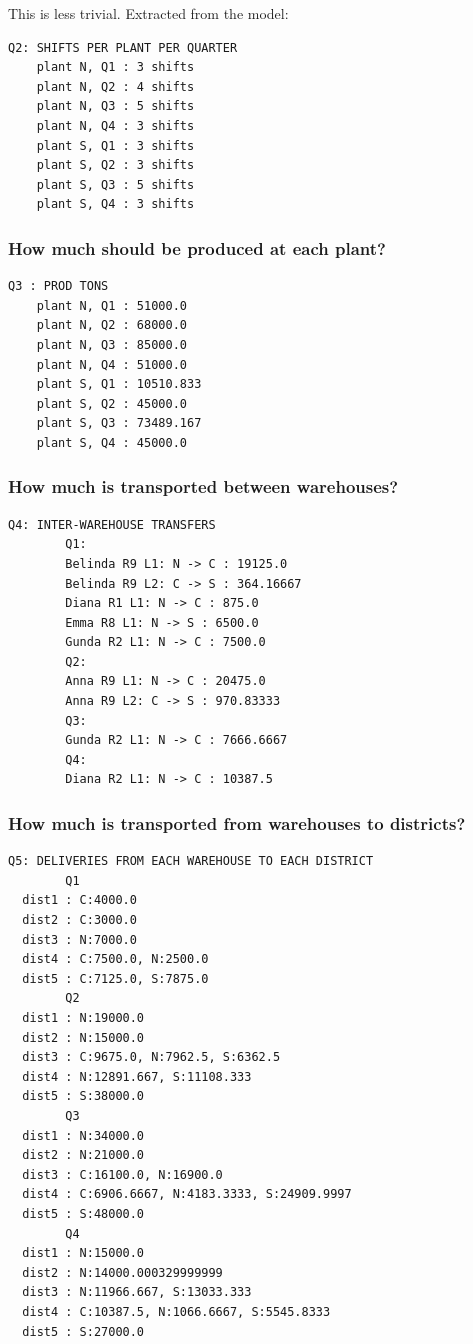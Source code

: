 \documentclass[10pt]{article}
\begin{document}
This is less trivial. Extracted from the model: 

\begin{verbatim}
Q2: SHIFTS PER PLANT PER QUARTER
    plant N, Q1 : 3 shifts
    plant N, Q2 : 4 shifts
    plant N, Q3 : 5 shifts
    plant N, Q4 : 3 shifts
    plant S, Q1 : 3 shifts
    plant S, Q2 : 3 shifts
    plant S, Q3 : 5 shifts
    plant S, Q4 : 3 shifts
\end{verbatim}
\subsubsection{How much should be produced at each plant?}
\begin{verbatim}
Q3 : PROD TONS
    plant N, Q1 : 51000.0
    plant N, Q2 : 68000.0
    plant N, Q3 : 85000.0
    plant N, Q4 : 51000.0
    plant S, Q1 : 10510.833
    plant S, Q2 : 45000.0
    plant S, Q3 : 73489.167
    plant S, Q4 : 45000.0
\end{verbatim}
\subsubsection{How much is transported between warehouses?}
\begin{verbatim}
Q4: INTER-WAREHOUSE TRANSFERS
        Q1:
        Belinda R9 L1: N -> C : 19125.0
        Belinda R9 L2: C -> S : 364.16667
        Diana R1 L1: N -> C : 875.0
        Emma R8 L1: N -> S : 6500.0
        Gunda R2 L1: N -> C : 7500.0
        Q2:
        Anna R9 L1: N -> C : 20475.0
        Anna R9 L2: C -> S : 970.83333
        Q3:
        Gunda R2 L1: N -> C : 7666.6667
        Q4:
        Diana R2 L1: N -> C : 10387.5
\end{verbatim}
\newpage 
\subsubsection{How much is transported from warehouses to districts?}
\begin{verbatim}
Q5: DELIVERIES FROM EACH WAREHOUSE TO EACH DISTRICT 
        Q1
  dist1 : C:4000.0
  dist2 : C:3000.0
  dist3 : N:7000.0
  dist4 : C:7500.0, N:2500.0
  dist5 : C:7125.0, S:7875.0
        Q2
  dist1 : N:19000.0
  dist2 : N:15000.0
  dist3 : C:9675.0, N:7962.5, S:6362.5
  dist4 : N:12891.667, S:11108.333
  dist5 : S:38000.0
        Q3
  dist1 : N:34000.0
  dist2 : N:21000.0
  dist3 : C:16100.0, N:16900.0
  dist4 : C:6906.6667, N:4183.3333, S:24909.9997
  dist5 : S:48000.0
        Q4
  dist1 : N:15000.0
  dist2 : N:14000.000329999999
  dist3 : N:11966.667, S:13033.333
  dist4 : C:10387.5, N:1066.6667, S:5545.8333
  dist5 : S:27000.0
\end{verbatim}
\end{document}
